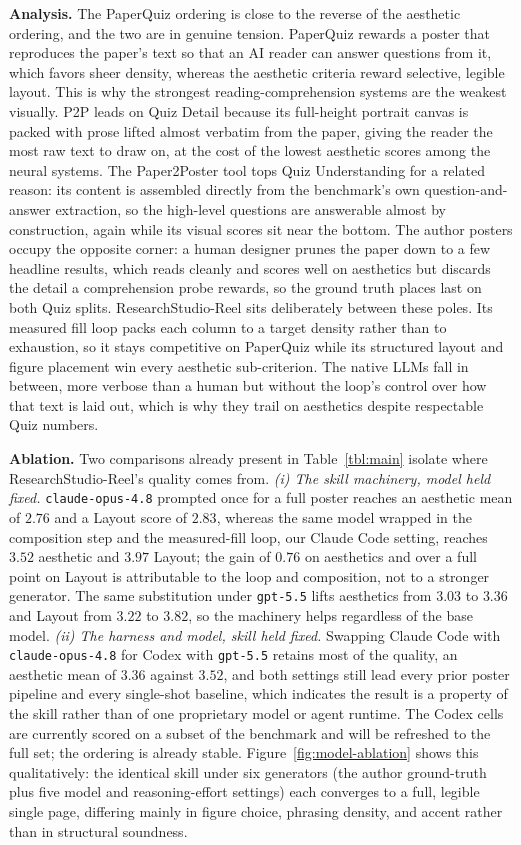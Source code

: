 \documentclass{article}
\newcommand{\reelword}{\textcolor{msred}{R}\textcolor{msgreen}{e}\textcolor{msblue}{e}\textcolor{msyellow}{l}}
\begin{document}
\textbf{Analysis.} The PaperQuiz ordering is close to the reverse of the aesthetic ordering, and the two are in genuine tension. PaperQuiz rewards a poster that reproduces the paper's text so that an AI reader can answer questions from it, which favors sheer density, whereas the aesthetic criteria reward selective, legible layout. This is why the strongest reading-comprehension systems are the weakest visually. P2P leads on Quiz Detail because its full-height portrait canvas is packed with prose lifted almost verbatim from the paper, giving the reader the most raw text to draw on, at the cost of the lowest aesthetic scores among the neural systems. The Paper2Poster tool tops Quiz Understanding for a related reason: its content is assembled directly from the benchmark's own question-and-answer extraction, so the high-level questions are answerable almost by construction, again while its visual scores sit near the bottom. The author posters occupy the opposite corner: a human designer prunes the paper down to a few headline results, which reads cleanly and scores well on aesthetics but discards the detail a comprehension probe rewards, so the ground truth places last on both Quiz splits. ResearchStudio-\reelword{} sits deliberately between these poles. Its measured fill loop packs each column to a target density rather than to exhaustion, so it stays competitive on PaperQuiz while its structured layout and figure placement win every aesthetic sub-criterion. The native LLMs fall in between, more verbose than a human but without the loop's control over how that text is laid out, which is why they trail on aesthetics despite respectable Quiz numbers.

\textbf{Ablation.} Two comparisons already present in Table~\ref{tbl:main} isolate where ResearchStudio-\reelword{}'s quality comes from. \emph{(i) The skill machinery, model held fixed.} \texttt{claude-opus-4.8} prompted once for a full poster reaches an aesthetic mean of $2.76$ and a Layout score of $2.83$, whereas the same model wrapped in the composition step and the measured-fill loop, our Claude Code setting, reaches $3.52$ aesthetic and $3.97$ Layout; the gain of $0.76$ on aesthetics and over a full point on Layout is attributable to the loop and composition, not to a stronger generator. The same substitution under \texttt{gpt-5.5} lifts aesthetics from $3.03$ to $3.36$ and Layout from $3.22$ to $3.82$, so the machinery helps regardless of the base model. \emph{(ii) The harness and model, skill held fixed.} Swapping Claude Code with \texttt{claude-opus-4.8} for Codex with \texttt{gpt-5.5} retains most of the quality, an aesthetic mean of $3.36$ against $3.52$, and both settings still lead every prior poster pipeline and every single-shot baseline, which indicates the result is a property of the skill rather than of one proprietary model or agent runtime. The Codex cells are currently scored on a subset of the benchmark and will be refreshed to the full set; the ordering is already stable. Figure~\ref{fig:model-ablation} shows this qualitatively: the identical skill under six generators (the author ground-truth plus five model and reasoning-effort settings) each converges to a full, legible single page, differing mainly in figure choice, phrasing density, and accent rather than in structural soundness.
\end{document}
